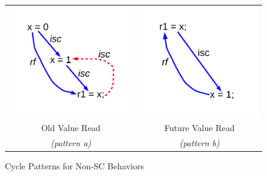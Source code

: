 \begin{figure}[!ht]
\centering
\begin{tabular}{cc}
\includegraphics[scale=.45]{figures/old_val_isc}&
\includegraphics[scale=.45]{figures/future_val_isc}\\
Old Value Read&Future Value Read\\
\textit{(pattern a)}&\textit{(pattern b)}
\end{tabular}
\caption{\label{fig:fence_implications}Cycle Patterns for Non-SC Behaviors}
\end{figure}



